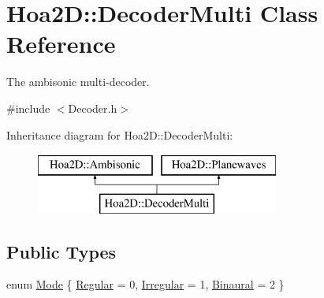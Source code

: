 \hypertarget{class_hoa2_d_1_1_decoder_multi}{\section{Hoa2\-D\-:\-:Decoder\-Multi Class Reference}
\label{class_hoa2_d_1_1_decoder_multi}
}


The ambisonic multi-\/decoder.  




{\ttfamily \#include $<$Decoder.\-h$>$}

Inheritance diagram for Hoa2\-D\-:\-:Decoder\-Multi\-:\begin{figure}[H]
\begin{center}
\leavevmode
\includegraphics[height=2.000000cm]{class_hoa2_d_1_1_decoder_multi}
\end{center}
\end{figure}
\subsection*{Public Types}
\begin{DoxyCompactItemize}
\item 
enum \hyperlink{class_hoa2_d_1_1_decoder_multi_a0ac23d6bd77378d9cd5ddf6e71029300}{Mode} \{ \hyperlink{class_hoa2_d_1_1_decoder_multi_a0ac23d6bd77378d9cd5ddf6e71029300abaf1a2b64008b0199ced6e486911aed2}{Regular} = 0, 
\hyperlink{class_hoa2_d_1_1_decoder_multi_a0ac23d6bd77378d9cd5ddf6e71029300afad959e312fd3402f086633b221008a3}{Irregular} = 1, 
\hyperlink{class_hoa2_d_1_1_decoder_multi_a0ac23d6bd77378d9cd5ddf6e71029300a1d1ea5f4bbb54e7062cf1c74e8ae2db0}{Binaural} = 2
 \}
\end{DoxyCompactItemize}
